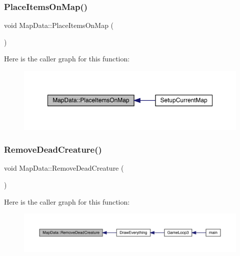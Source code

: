 \subsubsection{\texorpdfstring{Place\+Items\+On\+Map()}{PlaceItemsOnMap()}}
{\footnotesize\ttfamily void Map\+Data\+::\+Place\+Items\+On\+Map (\begin{DoxyParamCaption}{ }\end{DoxyParamCaption})}

Here is the caller graph for this function\+:
\nopagebreak
\begin{figure}[H]
\begin{center}
\leavevmode
\includegraphics[width=350pt]{class_map_data_aae575fa856f1d179220c4781873fd635_icgraph}
\end{center}
\end{figure}
\mbox{\label{class_map_data_a737946a4648a34f99452a6bff1b727f6}} 
\subsubsection{\texorpdfstring{Remove\+Dead\+Creature()}{RemoveDeadCreature()}}
{\footnotesize\ttfamily void Map\+Data\+::\+Remove\+Dead\+Creature (\begin{DoxyParamCaption}{ }\end{DoxyParamCaption})}

Here is the caller graph for this function\+:
\nopagebreak
\begin{figure}[H]
\begin{center}
\leavevmode
\includegraphics[width=350pt]{class_map_data_a737946a4648a34f99452a6bff1b727f6_icgraph}
\end{center}
\end{figure}
\mbox{\label{class_map_data_ad62fed28a640928527502b00b291aabd}} 
